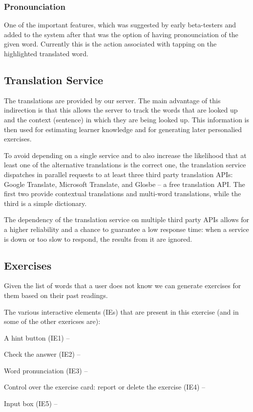 \subsubsection{Pronounciation}
One of the important features, which was suggested by early beta-testers and added to the system after that was the option of having pronounciation of the given word. Currently this is the action associated with tapping on the highlighted translated word.


\subsection {Translation Service}

The translations are provided by our server. The main advantage of this indirection is that this allows the server to track the words that are looked up and the context (sentence) in which they are being looked up. This information is then used for estimating learner knowledge and for generating later personalied exercises. 

To avoid depending on a single service and to also increase the likelihood that at least one of the alternative translations is the correct one, the translation service dispatches in parallel requests to at least three third party translation APIs: Google Translate, Microsoft Translate, and Glosbe -- a free translation API. The first two provide contextual translations and multi-word translations, while the third is a simple dictionary. 

The dependency of the translation service on multiple third party APIs allows for a higher reliability and a chance to guarantee a low response time: when a service is down or too slow to respond, the results from it are ignored.

\subsection {Exercises}

Given the list of words that a user does not know we can generate exercises for them based on their past readings.

The various interactive elements (IEs) that are present in this exercise (and in some of the other exericses are): 

\begin{description}
	\item A hint button (IE1) --
	\item Check the answer (IE2) -- 
	\item Word pronunciation (IE3) -- 
	\item Control over the exercise card: report or delete the exercise (IE4) -- 
	\item Input box (IE5) -- 
\end{description}

